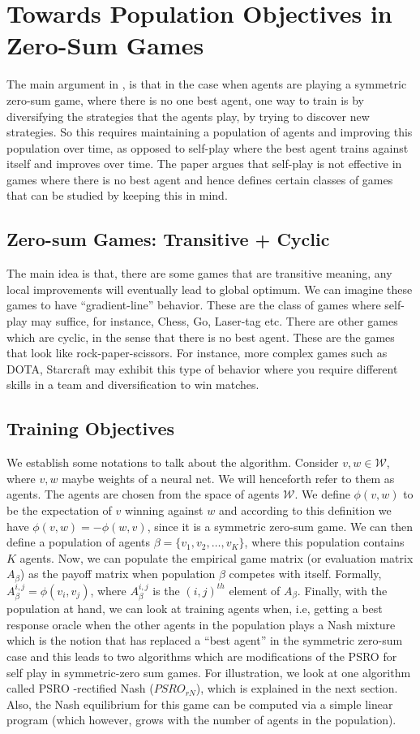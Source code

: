 \documentclass{article}
\begin{document}
\section{Towards Population Objectives in Zero-Sum Games}
The main argument in \cite{Balduzzi2019OpenendedLI}, is that in the case when agents are playing a symmetric zero-sum game, where there is no one best agent, one way to train is by diversifying the strategies that the agents play, by trying to discover new strategies. So this requires maintaining a population of agents and improving this population over time, as opposed to self-play where the best agent trains against itself and improves over time. The paper argues that self-play is not effective in games where there is no best agent and hence defines certain classes of games that can be studied by keeping this in mind.
\subsection{Zero-sum Games: Transitive + Cyclic}
The main idea is that, there are some games that are transitive meaning, any local improvements will eventually lead to global optimum. We can imagine these games to have ``gradient-line'' behavior. These are the class of games where self-play may suffice, for instance, Chess, Go, Laser-tag etc.
There are other games which are cyclic, in the sense that there is no best agent. These are the games that look like rock-paper-scissors. For instance, more complex games such as DOTA, Starcraft may exhibit this type of behavior where you require different skills in a team and diversification to win matches.
\subsection{Training Objectives}
We establish some notations to talk about the algorithm. Consider $v,w \in \mathcal{W}$, where $v,w$ maybe weights of a neural net. We will henceforth refer to them as agents. The agents are chosen from the space of agents $\mathcal{W}$. We define $\phi(v,w)$ to be the expectation of $v$ winning against $w$ and according to this definition we have $\phi(v,w)=-\phi(w,v)$, since it is a symmetric zero-sum game. We can then define a population of agents $\beta=\{v_1,v_2,\ldots,v_K\}$, where this population contains $K$ agents. 
Now, we can populate the empirical game matrix (or evaluation matrix $A_{\beta}$) as the payoff matrix when population $\beta$ competes with itself. Formally, $A_{\beta}^{i,j}=\phi(v_i,v_j)$, where $A_{\beta}^{i,j}$ is the $(i,j)^{th}$ element of $A_{\beta}$.
Finally, with the population at hand, we can look at training agents when, i.e, getting a best response oracle when the other agents in the population plays a Nash mixture which is the notion that has replaced a ``best agent'' in the symmetric zero-sum case and this leads to two algorithms which are modifications of the PSRO for self play in symmetric-zero sum games. For illustration, we look at one algorithm called PSRO -rectified Nash ($PSRO_{rN}$), which is explained in the next section. Also, the Nash equilibrium for this game can be computed via a simple linear program (which however, grows with the number of agents in the population). 
\end{document}
